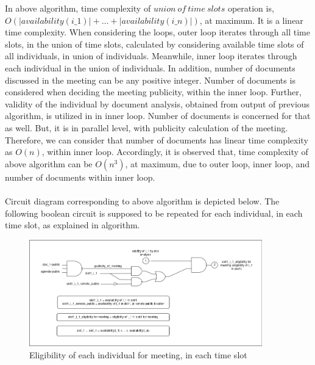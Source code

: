 In above algorithm, time complexity of $union\ of\ time\ slots$ operation is,\\ $O(|availability(i\_1)| + \dots + |availability(i\_n)|)$, at maximum. It is a linear time complexity. When considering the loops, outer loop iterates through all time slots, in the union of time slots, calculated by considering available time slots of all individuals, in union of individuals. Meanwhile, inner loop iterates through each individual in the union of individuals. In addition, number of documents discussed in the meeting can be any positive integer. Number of documents is considered when deciding the meeting publicity, within the inner loop. Further, validity of the individual by document analysis, obtained from output of previous algorithm, is utilized in in inner loop. Number of documents is concerned for that as well. But, it is in parallel level, with publicity calculation of the meeting. Therefore, we can consider that number of documents has linear time complexity as $O(n)$, within inner loop. Accordingly, it is observed that, time complexity of above algorithm can be $O(n^{3})$, at maximum, due to outer loop, inner loop, and number of documents within inner loop.\\ \\
Circuit diagram corresponding to above algorithm is depicted below. The following boolean circuit is supposed to be repeated for each individual, in each time slot, as explained in algorithm.
\begin{figure}[H]
    \centering
    \includegraphics[width=0.9\textwidth]{./image/circuit_diagram/2_slot_n_i_n_eligibility.png}
    \caption{Eligibility of each individual for meeting, in each time slot}
    \label{fig:eligibility of each individual for meeting, in each time slot}
\end{figure} 

